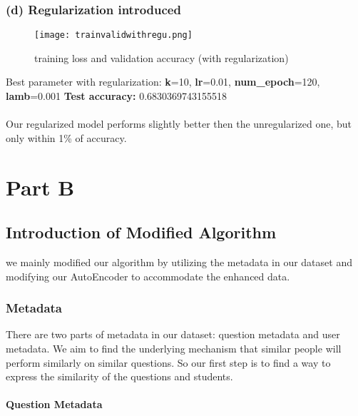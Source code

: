 \documentclass{article}
\begin{document}
\subsubsection*{(d) Regularization introduced}
\begin{figure}[H]
    \centering
    \texttt{[image: trainvalidwithregu.png]}
    \caption{training loss and validation accuracy (with regularization)}
    \label{fig:enter-label}
\end{figure}
Best parameter with regularization: \textbf{k}=10, \textbf{lr}=0.01, \textbf{num\_epoch}=120, \textbf{lamb}=0.001
\textbf{Test accuracy:}  0.6830369743155518\\
\\Our regularized model performs slightly better then the unregularized one, but only within 1\% of accuracy.




\newpage
\section*{Part B}

\subsection*{Introduction of Modified Algorithm}
we mainly modified our algorithm by utilizing the metadata in our dataset and modifying our AutoEncoder to accommodate the enhanced data.
\subsubsection*{Metadata}
There are two parts of metadata in our dataset: question metadata and user metadata. We aim to find the underlying mechanism that similar people will perform similarly on similar questions. So our first step is to find a way to express the similarity of the questions and students.
\\
\\
\textbf{Question Metadata}
\end{document}
